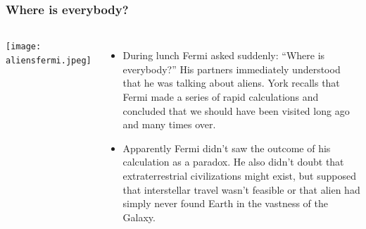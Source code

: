 \begin{frame}
\frametitle{Where is everybody?}

\begin{columns}
\texttt{[image: aliensfermi.jpeg]}

\begin{itemize}

\item During lunch Fermi asked suddenly: ``Where is everybody?'' His partners immediately understood that he was talking about aliens. York recalls that Fermi made a series of rapid calculations and concluded that we should have been visited long ago and many times over.

\item Apparently Fermi didn’t saw the outcome of his calculation as a paradox. He also didn't doubt that extraterrestrial civilizations might exist, but supposed that interstellar travel wasn’t feasible or that alien had simply never found Earth in the vastness of the Galaxy. 
\end{itemize}   
\end{columns}
\end{frame}

